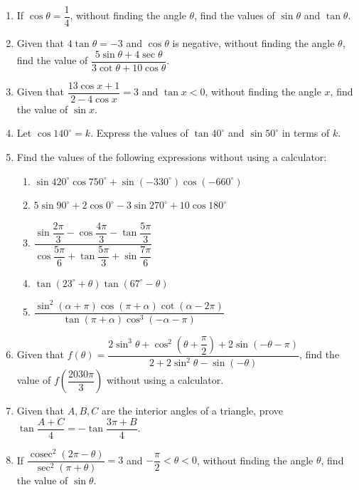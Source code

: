 \documentclass{report}
\begin{document}
\begin{enumerate}[start=4]
    \item If \( \cos \theta=\dfrac{1}{4} \), without finding the angle \( \theta \), find the values of \( \sin \theta \) and \( \tan \theta \).
    \item Given that \( 4 \tan \theta=-3 \) and \( \cos \theta \) is negative, without finding the angle \( \theta \), find the value of \( \dfrac{5 \sin \theta+4 \sec \theta}{3 \cot \theta+10 \cos \theta} \).
    \item Given that \( \dfrac{13 \cos x+1}{2-4 \cos x}=3 \) and \( \tan x<0 \), without finding the angle \( x \), find the value of \( \sin x \).
    \item Let \( \cos 140^{\circ}=k \). Express the values of \( \tan 40^{\circ} \) and \( \sin 50^{\circ} \) in terms of \( k \).
    \item Find the values of the following expressions without using a calculator:
    \begin{enumerate}[label=(\alph*)]
        \item \( \sin 420^{\circ} \cos 750^{\circ}+\sin (-330^{\circ}) \cos (-660^{\circ}) \)
        \item \( 5 \sin 90^{\circ}+2 \cos 0^{\circ}-3 \sin 270^{\circ}+10 \cos 180^{\circ} \)
        \item \( \dfrac{\sin \dfrac{2 \pi}{3}-\cos \dfrac{4 \pi}{3}-\tan \dfrac{5 \pi}{3}}{\cos \dfrac{5 \pi}{6}+\tan \dfrac{5 \pi}{3}+\sin \dfrac{7 \pi}{6}} \)
        \item \( \tan (23^{\circ}+\theta) \tan (67^{\circ}-\theta) \)
        \item \( \dfrac{\sin ^2(\alpha+\pi) \cos (\pi+\alpha) \cot (\alpha-2 \pi)}{\tan (\pi+\alpha) \cos ^3(-\alpha-\pi)} \)
    \end{enumerate}
    
    \item Given that \( f(\theta)=\dfrac{2 \sin ^3 \theta+\cos ^2\left(\theta+\dfrac{\pi}{2}\right)+2 \sin (-\theta-\pi)}{2+2 \sin ^2 \theta-\sin (-\theta)} \), find the value of \( f\left(\dfrac{2030 \pi}{3}\right) \) without using a calculator.
    
    \item Given that \( A, B, C \) are the interior angles of a triangle, prove \( \tan \dfrac{A+C}{4}=-\tan \dfrac{3 \pi+B}{4} \).
    
    \item If \( \dfrac{\operatorname{cosec}^2(2 \pi-\theta)}{\sec^2(\pi+\theta)}=3 \) and \( -\dfrac{\pi}{2}<\theta<0 \), without finding the angle \( \theta \), find the value of \( \sin \theta \).
    

\end{enumerate}
\end{document}
